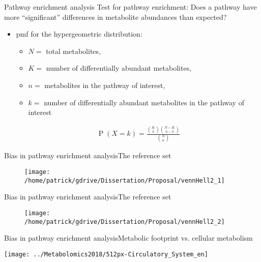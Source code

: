 \documentclass[xcolor=dvipsnames]{beamer}
\DeclareMathOperator{\PP}{P}
\begin{document}
\begin{frame}{Pathway enrichment analysis}
	\vspace{-10pt}
{\Large Test for pathway enrichment: Does a pathway have more ``significant'' differences in metabolite abundances than expected?} \vspace{10pt} \pause

	\begin{itemize}
		\item pmf for the hypergeometric distribution: 
		\begin{itemize}
			\item $N=$ total metabolites,
			\item $K=$ number of differentially abundant metabolites, 
			\item $n=$ metabolites in the pathway of interest, 
			\item $k=$ number of differentially abundant metabolites in the pathway of interest 
		\end{itemize}
		\begin{align*}
		\PP(X=k) = \frac{  {{K}\choose{k}} {{N-K}\choose{n-k}}  }{ {{N}\choose{n}} } 
		\end{align*}
	\end{itemize}
\end{frame}

\begin{frame}{Bias in pathway enrichment analysis}{The reference set}
	\vspace{-15.5pt}
	\begin{figure}
		\texttt{[image: /home/patrick/gdrive/Dissertation/Proposal/vennHell2\_1]}
	\end{figure}
\end{frame}

\begin{frame}{Bias in pathway enrichment analysis}{The reference set}
	\vspace{-15.5pt}
	\begin{figure}
		\texttt{[image: /home/patrick/gdrive/Dissertation/Proposal/vennHell2\_2]}
	\end{figure}
\addtocounter{framenumber}{-1}
\end{frame}

\begin{frame}{Bias in pathway enrichment analysis}{Metabolic footprint vs. cellular metabolism}
\vspace{-10.5pt}
	\begin{center}
		\texttt{[image: ../Metabolomics2018/512px-Circulatory\_System\_en]}
	\end{center}
\end{frame}
\end{document}
